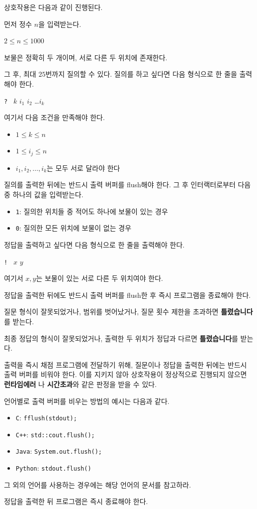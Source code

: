 상호작용은 다음과 같이 진행된다.

먼저 정수 $n$을 입력받는다.

\begin{center}
$2 \le n \le 1000$
\end{center}

보물은 정확히 두 개이며, 서로 다른 두 위치에 존재한다.

그 후, 최대 $25$번까지 질의할 수 있다.
질의를 하고 싶다면 다음 형식으로 한 줄을 출력해야 한다.
\begin{center}
\texttt{? } $k$ $i_1$ $i_2$ \dots $i_k$
\end{center}

여기서 다음 조건을 만족해야 한다.
\begin{itemize}
\item $1 \le k \le n$
\item $1 \le i_j \le n$
\item $i_1, i_2, \dots, i_k$는 모두 서로 달라야 한다
\end{itemize}

질의를 출력한 뒤에는 반드시 출력 버퍼를 flush해야 한다.
그 후 인터랙터로부터 다음 중 하나의 값을 입력받는다.
\begin{itemize}
\item \texttt{1}: 질의한 위치들 중 적어도 하나에 보물이 있는 경우
\item \texttt{0}: 질의한 모든 위치에 보물이 없는 경우
\end{itemize}

정답을 출력하고 싶다면 다음 형식으로 한 줄을 출력해야 한다.
\begin{center}
\texttt{! } $x$ $y$
\end{center}

여기서 $x, y$는 보물이 있는 서로 다른 두 위치여야 한다.

정답을 출력한 뒤에도 반드시 출력 버퍼를 flush한 후 즉시 프로그램을 종료해야 한다.

질문 형식이 잘못되었거나, 범위를 벗어났거나, 질문 횟수 제한을 초과하면 \textbf{틀렸습니다}를 받는다.

최종 정답의 형식이 잘못되었거나, 출력한 두 위치가 정답과 다르면 \textbf{틀렸습니다}를 받는다.

출력을 즉시 채점 프로그램에 전달하기 위해, 질문이나 정답을 출력한 뒤에는 반드시 출력 버퍼를 비워야 한다.
이를 지키지 않아 상호작용이 정상적으로 진행되지 않으면 \textbf{런타임에러} 나 \textbf{시간초과}와 같은 판정을 받을 수 있다.

언어별로 출력 버퍼를 비우는 방법의 예시는 다음과 같다.

\begin{itemize}
    \item \texttt{C}: \texttt{fflush(stdout);}
    \item \texttt{C++}: \texttt{std::cout.flush();}
    \item \texttt{Java}: \texttt{System.out.flush();}
    \item \texttt{Python}: \texttt{stdout.flush()}
\end{itemize}

그 외의 언어를 사용하는 경우에는 해당 언어의 문서를 참고하라.

정답을 출력한 뒤 프로그램은 즉시 종료해야 한다.